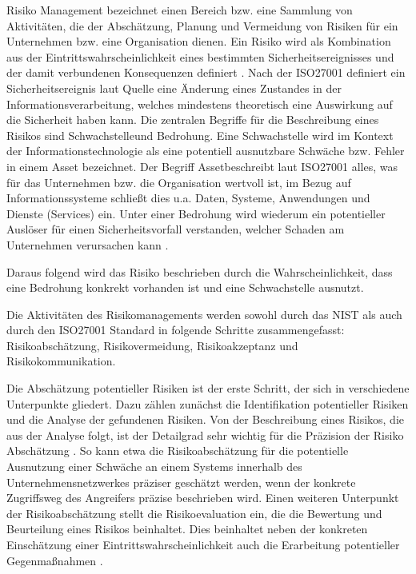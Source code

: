 Risiko Management bezeichnet einen Bereich bzw. eine Sammlung von Aktivitäten, die der Abschätzung, Planung und Vermeidung von Risiken für ein Unternehmen bzw. eine Organisation dienen. Ein Risiko wird als Kombination aus der Eintrittswahrscheinlichkeit eines bestimmten Sicherheitsereignisses und der damit verbundenen Konsequenzen definiert \citep{Partida2010}. Nach der ISO27001 
definiert ein Sicherheitsereignis laut Quelle \citep{RM2} eine Änderung eines Zustandes in der Informationsverarbeitung, welches mindestens theoretisch eine Auswirkung auf die Sicherheit haben kann. 
Die zentralen Begriffe für die Beschreibung eines Risikos sind \glqq Schwachstelle\grqq     und \glqq Bedrohung\grqq . Eine Schwachstelle wird im Kontext der Informationstechnologie als eine potentiell ausnutzbare Schwäche bzw. Fehler in einem Asset bezeichnet. Der Begriff \glqq Asset\grqq  beschreibt laut ISO27001 alles, was für das Unternehmen bzw. die Organisation wertvoll ist, im Bezug auf Informationssysteme schließt dies u.a. Daten, Systeme, Anwendungen und Dienste (Services) ein. Unter einer Bedrohung wird wiederum ein potentieller Auslöser für einen Sicherheitsvorfall verstanden, welcher Schaden am Unternehmen verursachen kann \citep{RM2}.

Daraus folgend wird das Risiko beschrieben durch die Wahrscheinlichkeit, dass eine Bedrohung konkrekt vorhanden ist und eine Schwachstelle ausnutzt.


Die Aktivitäten des Risikomanagements werden sowohl durch das NIST als auch durch den ISO27001 Standard in folgende Schritte zusammengefasst: Risikoabschätzung, Risikovermeidung, Risikoakzeptanz und Risikokommunikation.

Die Abschätzung potentieller Risiken ist der erste Schritt, der sich in verschiedene Unterpunkte gliedert. Dazu zählen zunächst die Identifikation potentieller Risiken und die Analyse der gefundenen Risiken. Von der Beschreibung eines Risikos, die aus der Analyse folgt, ist der Detailgrad sehr wichtig für die Präzision der Risiko Abschätzung \citep{RM2}. %
So kann etwa die Risikoabschätzung für die potentielle Ausnutzung einer Schwäche an einem Systems innerhalb des Unternehmensnetzwerkes präziser geschätzt werden, wenn der konkrete Zugriffsweg des Angreifers präzise beschrieben wird. Einen weiteren Unterpunkt der Risikoabschätzung stellt die Risikoevaluation ein, die die Bewertung und Beurteilung eines Risikos beinhaltet. Dies beinhaltet neben der konkreten Einschätzung einer Eintrittswahrscheinlichkeit auch die Erarbeitung potentieller Gegenmaßnahmen \citep{Partida2010}.

